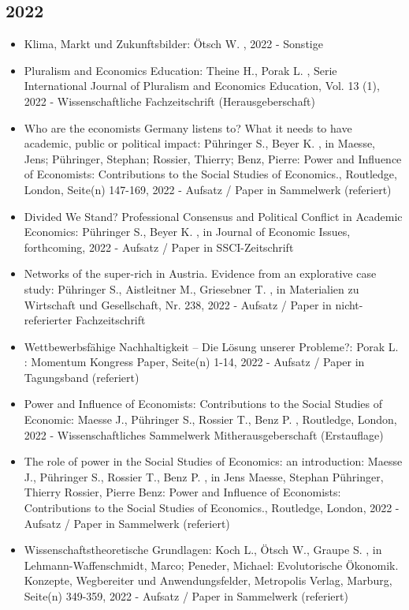  \subsection{2022} 
 \begin{itemize} 
	 \item Klima, Markt und Zukunftsbilder: Ötsch W. , 2022 - Sonstige
	 \item Pluralism and Economics Education: Theine H., Porak L. , Serie International Journal of Pluralism and Economics Education, Vol. 13 (1), 2022 - Wissenschaftliche Fachzeitschrift (Herausgeberschaft)
	 \item Who are the economists Germany listens to? What it needs to have academic, public or political impact: Pühringer S., Beyer K. , in Maesse, Jens; Pühringer, Stephan; Rossier, Thierry; Benz, Pierre: Power and Influence of Economists: Contributions to the Social Studies of Economics., Routledge, London, Seite(n) 147-169, 2022 - Aufsatz / Paper in Sammelwerk (referiert)
	 \item Divided We Stand? Professional Consensus and Political Conflict in Academic Economics: Pühringer S., Beyer K. , in Journal of Economic Issues, forthcoming, 2022 - Aufsatz / Paper in SSCI-Zeitschrift
	 \item Networks of the super-rich in Austria. Evidence from an explorative case study: Pühringer S., Aistleitner M., Griesebner T. , in Materialien zu Wirtschaft und Gesellschaft, Nr. 238, 2022 - Aufsatz / Paper in nicht-referierter Fachzeitschrift
	 \item Wettbewerbsfähige Nachhaltigkeit – Die Lösung unserer Probleme?: Porak L. : Momentum Kongress Paper, Seite(n) 1-14, 2022 - Aufsatz / Paper in Tagungsband (referiert)
	 \item Power and Influence of Economists: Contributions to the Social Studies of Economic: Maesse J., Pühringer S., Rossier T., Benz P. , Routledge, London, 2022 - Wissenschaftliches Sammelwerk Mitherausgeberschaft (Erstauflage)
	 \item The role of power in the Social Studies of Economics: an introduction: Maesse J., Pühringer S., Rossier T., Benz P. , in Jens Maesse, Stephan Pühringer, Thierry Rossier,  Pierre Benz: Power and Influence of Economists: Contributions to the Social Studies of Economics., Routledge, London, 2022 - Aufsatz / Paper in Sammelwerk (referiert)
	 \item Wissenschaftstheoretische Grundlagen: Koch L., Ötsch W., Graupe S. , in Lehmann-Waffenschmidt, Marco; Peneder, Michael: Evolutorische Ökonomik. Konzepte, Wegbereiter und Anwendungsfelder, Metropolis Verlag, Marburg, Seite(n) 349-359, 2022 - Aufsatz / Paper in Sammelwerk (referiert)

\end{itemize}

